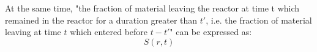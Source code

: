 At the same time, "the fraction of material leaving the reactor at time t which remained in the reactor for a duration greater than $t'$, i.e. the fraction of material leaving at time $t$ which entered before $t-t'$"  can be expressed as:
\begin{equation}
S(r,t)
\end{equation}